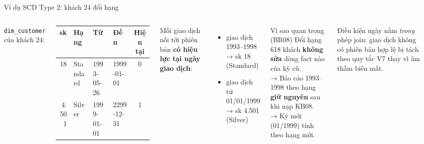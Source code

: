\documentclass[aspectratio=169,11pt]{beamer}
\newcommand{\tbl}[1]{\texttt{#1}}
\begin{document}
\begin{frame}{Ví dụ SCD Type 2: khách 24 đổi hạng}
  \begin{columns}[T]
    \footnotesize
    \tbl{dim\_customer} của khách 24:\par\smallskip
    \scriptsize\setlength{\tabcolsep}{3pt}
    \begin{tabular}{r l l l c}
      \toprule
      \textbf{sk} & \textbf{Hạng} & \textbf{Từ} & \textbf{Đến} & \textbf{Hiện tại} \\
      \midrule
      18 & Standard & 1993-05-26 & 1999-01-01 & 0 \\
      4.501 & Silver & 1999-01-01 & 2299-12-31 & 1 \\
      \bottomrule
    \end{tabular}
    \bigskip

    \small Mỗi giao dịch nối tới phiên bản \textbf{có hiệu lực tại ngày giao dịch}:
    \begin{itemize}
      \item giao dịch 1993--1998 → sk 18 (Standard)
      \item giao dịch từ 01/01/1999 → sk 4.501 (Silver)
    \end{itemize}
    \begin{block}{Vì sao quan trọng (BR08)}
      \small Đổi hạng 618 khách \textbf{không sửa} dòng fact nào của kỳ cũ.\\[3pt]
      → Báo cáo 1993--1998 theo hạng \textbf{giữ nguyên} sau khi nạp KB08.\\[3pt]
      → Kỳ mới (01/1999) tính theo hạng mới.
    \end{block}
    \smallskip
    \footnotesize Điều kiện ngày nằm \emph{trong} phép join: giao dịch không có phiên bản hợp lệ bị tách theo quy tắc V7 thay vì âm thầm biến mất.
  \end{columns}
\end{frame}
\end{document}
